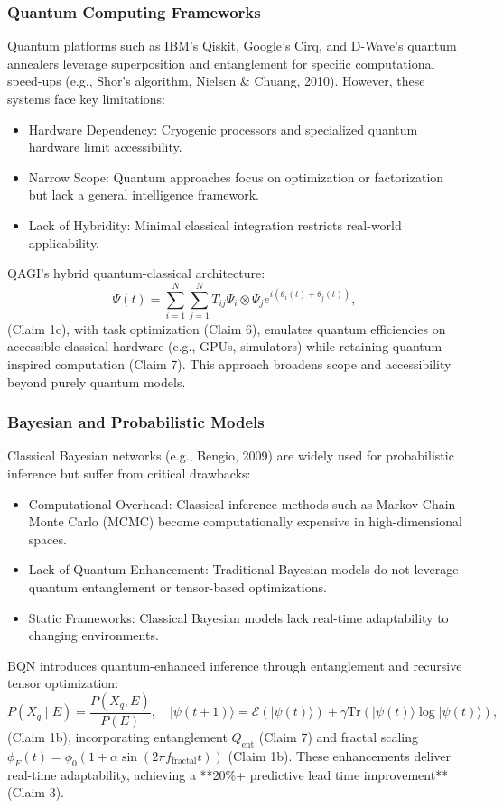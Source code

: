 \documentclass{article}
\theoremstyle{plain}
\theoremstyle{claimstyle}
\begin{document}
\subsubsection{Quantum Computing Frameworks}
Quantum platforms such as IBM’s Qiskit, Google’s Cirq, and D-Wave’s quantum annealers leverage superposition and entanglement for specific computational speed-ups (e.g., Shor’s algorithm, Nielsen \& Chuang, 2010). However, these systems face key limitations:
\begin{itemize}
    \item Hardware Dependency: Cryogenic processors and specialized quantum hardware limit accessibility.
    \item Narrow Scope: Quantum approaches focus on optimization or factorization but lack a general intelligence framework.
    \item Lack of Hybridity: Minimal classical integration restricts real-world applicability.
\end{itemize}
QAGI’s hybrid quantum-classical architecture:
\begin{equation}
\Psi(t) = \sum_{i=1}^N \sum_{j=1}^N T_{ij} \Psi_i \otimes \Psi_j e^{i(\theta_i(t) + \theta_j(t))},
\end{equation}
(Claim 1c), with task optimization (Claim 6), emulates quantum efficiencies on accessible classical hardware (e.g., GPUs, simulators) while retaining quantum-inspired computation (Claim 7). This approach broadens scope and accessibility beyond purely quantum models.

\subsubsection{Bayesian and Probabilistic Models}
Classical Bayesian networks (e.g., Bengio, 2009) are widely used for probabilistic inference but suffer from critical drawbacks:
\begin{itemize}
    \item Computational Overhead: Classical inference methods such as Markov Chain Monte Carlo (MCMC) become computationally expensive in high-dimensional spaces.
    \item Lack of Quantum Enhancement: Traditional Bayesian models do not leverage quantum entanglement or tensor-based optimizations.
    \item Static Frameworks: Classical Bayesian models lack real-time adaptability to changing environments.
\end{itemize}
BQN introduces quantum-enhanced inference through entanglement and recursive tensor optimization:
\begin{equation}
P(X_q \mid E) = \frac{P(X_q, E)}{P(E)}, \quad |\psi(t+1)\rangle = \mathcal{E}(|\psi(t)\rangle) + \gamma \text{Tr}(|\psi(t)\rangle \log |\psi(t)\rangle),
\end{equation}
(Claim 1b), incorporating entanglement \( Q_{\text{ent}} \) (Claim 7) and fractal scaling \( \phi_F(t) = \phi_0 (1 + \alpha \sin(2\pi f_{\text{fractal}} t)) \) (Claim 1b). These enhancements deliver real-time adaptability, achieving a **20\%+ predictive lead time improvement** (Claim 3).
\end{document}
